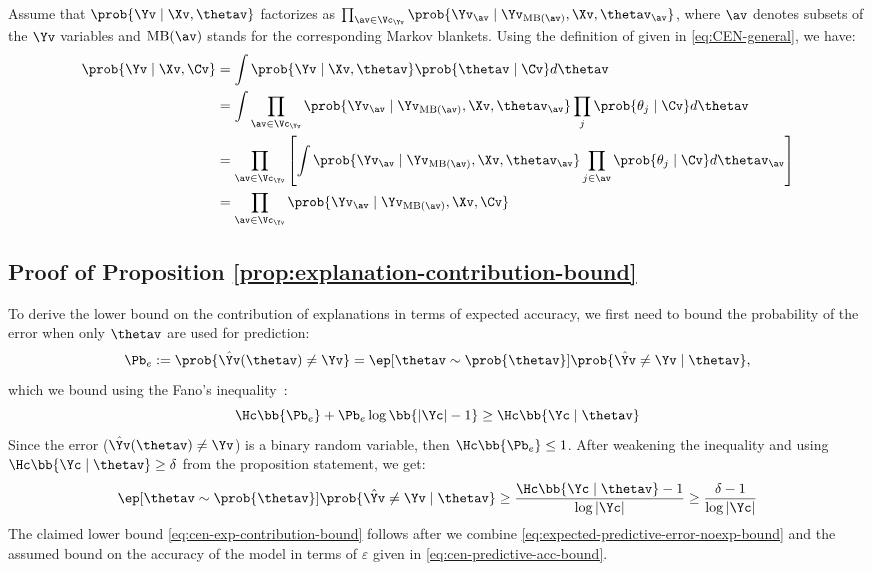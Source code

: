 \documentclass[twoside,11pt]{article}
\begin{document}
Assume that $\prob{\Yv \mid \Xv, \thetav}$ factorizes as $\prod_{\av \in \Vc_{\Yv}} \prob{\Yv_{\av} \mid \Yv_{\mathrm{MB}(\av)}, \Xv, \thetav_{\av}}$, where $\av$ denotes subsets of the $\Yv$ variables and $\mathrm{MB}(\av)$ stands for the corresponding Markov blankets.
Using the definition of {\CEN} given in \eqref{eq:CEN-general}, we have:
\begin{equation}
    \begin{split}
        \prob{\Yv \mid \Xv, \Cv}
        & = \int \prob{\Yv \mid \Xv, \thetav} \prob{\thetav \mid \Cv} d\thetav \\
        & = \int \prod_{\av \in \Vc_{\Yv}} \prob{\Yv_{\av} \mid \Yv_{\mathrm{MB}(\av)}, \Xv, \thetav_{\av}} \prod_{j}\prob{\theta_j \mid \Cv} d\thetav \\
        & = \prod_{\av \in \Vc_{\Yv}} \left[\int \prob{\Yv_{\av} \mid \Yv_{\mathrm{MB}(\av)}, \Xv, \thetav_{\av}} \prod_{j \in \av}\prob{\theta_j \mid \Cv} d\thetav_{\av}\right] \\
        & = \prod_{\av \in \Vc_{\Yv}} \prob{\Yv_{\av} \mid \Yv_{\mathrm{MB}(\av)}, \Xv, \Cv}
    \end{split}
\end{equation}

\subsection{Proof of Proposition \ref{prop:explanation-contribution-bound}}
\label{proof:explanation-contribution-bound}

To derive the lower bound on the contribution of explanations in terms of expected accuracy, we first need to bound the probability of the error when only $\thetav$ are used for prediction:
\begin{equation*}
    \Pb_e := \prob{\hat \Yv(\thetav) \neq \Yv} = \ep[\thetav \sim \prob{\thetav}]{\prob{\hat \Yv \neq \Yv \mid \thetav}},
\end{equation*}
which we bound using the Fano's inequality~\citep[Ch. 2.11,][]{cover2012elements}:
\begin{equation}
    \label{eq:fano-inequality}
    \Hc\bb{\Pb_e} + \Pb_e \log\bb{|\Yc| - 1} \geq \Hc\bb{\Yc \mid \thetav}
\end{equation}
Since the error ($\hat \Yv(\thetav) \neq \Yv$) is a binary random variable, then $\Hc\bb{\Pb_e} \leq 1$.
After weakening the inequality and using $\Hc\bb{\Yc \mid \thetav} \geq \delta$ from the proposition statement, we get:
\begin{equation}
    \label{eq:expected-predictive-error-noexp-bound}
    \ep[\thetav \sim \prob{\thetav}]{\prob{\hat \Yv \neq \Yv \mid \thetav}} \geq \frac{\Hc\bb{\Yc \mid \thetav} - 1}{\log|\Yc|} \geq \frac{\delta - 1}{\log|\Yc|}
\end{equation}
The claimed lower bound \eqref{eq:cen-exp-contribution-bound} follows after we combine \eqref{eq:expected-predictive-error-noexp-bound} and the assumed bound on the accuracy of the model in terms of $\varepsilon$ given in \eqref{eq:cen-predictive-acc-bound}.
\end{document}
